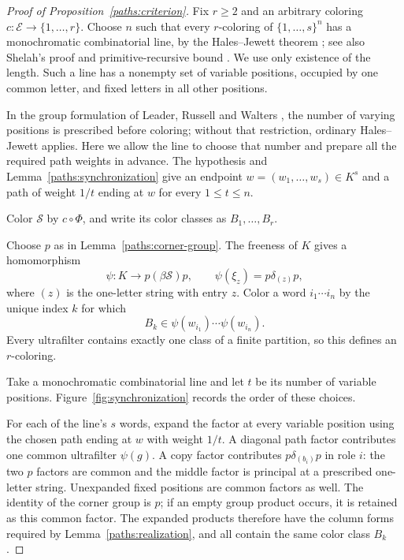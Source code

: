 \begin{proof}[Proof of Proposition~\ref{paths:criterion}]
Fix $r\ge2$ and an arbitrary coloring
$c:\mathcal E\to\{1,\ldots,r\}$. Choose $n$ such that every
$r$-coloring of $\{1,\ldots,s\}^n$ has a monochromatic
combinatorial line, by the Hales--Jewett theorem
\cite{hales-jewett}; see also Shelah's proof and primitive-recursive
bound \cite[p.~686 and Section~1]{shelah}. We use only existence of
the length. Such a line has a nonempty set of variable
positions, occupied by one common letter, and fixed letters in all
other positions.

In the group formulation of Leader, Russell and Walters
\cite[Conjecture~C and the following discussion]{lrw-transitive},
the number of varying positions is prescribed before coloring;
without that restriction, ordinary Hales--Jewett applies.
Here we allow the line to choose that number and prepare all the
required path weights in advance.
The hypothesis and Lemma~\ref{paths:synchronization} give an endpoint
$w=(w_1,\ldots,w_s)\in K^s$ and a path of weight $1/t$ ending at
$w$ for every $1\le t\le n$.

Color $\mathcal S$ by $c\circ\Phi$, and write its color classes
as $B_1,\ldots,B_r$.

Choose $p$ as in Lemma~\ref{paths:corner-group}. The freeness of $K$
gives a homomorphism
\[
\psi:K\longrightarrow p(\beta\mathcal S)p,
\qquad \psi(\xi_z)=p\delta_{(z)}p,
\]
where $(z)$ is the one-letter string with entry $z$.
Color a word $i_1\cdots i_n$ by the unique index $k$ for which
\[
B_k\in\psi(w_{i_1})\cdots\psi(w_{i_n}).
\]
Every ultrafilter contains exactly one class of a finite partition,
so this defines an $r$-coloring.

Take a monochromatic combinatorial line and let $t$ be its number
of variable positions. Figure~\ref{fig:synchronization} records the
order of these choices.



For each of the line's $s$ words, expand the factor
at every variable position using the chosen path ending at $w$ with
weight $1/t$. A diagonal path factor contributes one common
ultrafilter $\psi(g)$. A copy factor contributes
$p\delta_{(b_i)}p$ in role $i$: the two $p$ factors are common and
the middle factor is principal at a prescribed one-letter string.
Unexpanded fixed positions are common factors as well. The identity
of the corner group is $p$; if an empty group product occurs, it is
retained as this common factor. The expanded products therefore have
the column forms required by Lemma~\ref{paths:realization}, and all
contain the same color class $B_k$.


\end{proof}

